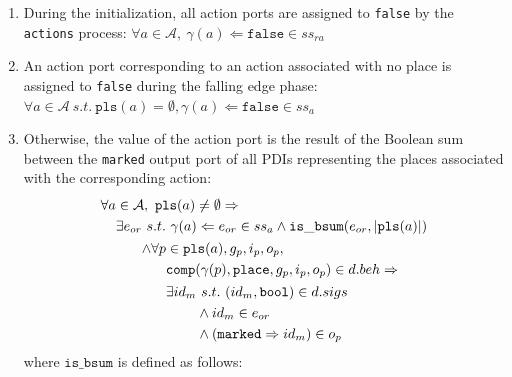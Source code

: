 \begin{definition}
\begin{enumerate}[resume]
\begin{enumerate}
    \item During the initialization, all action ports are assigned to
      \texttt{false} by the \texttt{actions} process:
      $\forall{}a\in\mathcal{A},~\gamma(a)\Leftarrow\mathtt{false}\in{}ss_{ra}$
      
    \item An action port corresponding to an action associated with no
      place is assigned to \texttt{false} during the falling edge
      phase:\\
      $\forall{}a\in\mathcal{A}~s.t.~\mathtt{pls}(a)=\emptyset,\gamma(a)\Leftarrow\mathtt{false}\in{}ss_{a}$
      
    \item Otherwise, the value of the action port is the result of the
      Boolean sum between the \texttt{marked} output port of all PDIs
      representing the places associated with the corresponding
      action:
      \begin{equation*}
        \begin{aligned}[t]
          \forall{}a&\in\mathcal{A},~\mathtt{pls}(a)\neq\emptyset\Rightarrow \\
                    &  \begin{aligned}[t]
                         \exists{}e_{or}& ~s.t.~\gamma(a)\Leftarrow{}e_{or}\in{}ss_a\land\mathtt{is\_bsum}(e_{or},\vert{}\mathtt{pls}(a)\vert) \\
                                        &
                                          \begin{aligned}
                                            \land\forall{}p& \in\mathtt{pls}(a),g_p,i_p,o_p, \\
                                                           & \mathtt{comp}(\gamma(p),\mathtt{place},g_p,i_p,o_p)\in{}d.beh\Rightarrow \\
                                                           &
                                                             \begin{aligned}
                                                               \exists{}id_m& ~s.t.~(id_m,\mathtt{bool})\in{}d.sigs \\
                                                                            &\land{}id_m\in{}e_{or} \\
                                                                            & \land(\mathtt{marked}\Rightarrow{}id_m)\in{}o_p \\
                                                             \end{aligned} \\
                                          \end{aligned} \\
                       \end{aligned} \\
        \end{aligned}
      \end{equation*}
      where $\mathtt{is\_bsum}$ is defined as follows:


\end{enumerate}
\end{enumerate}
\end{definition}
